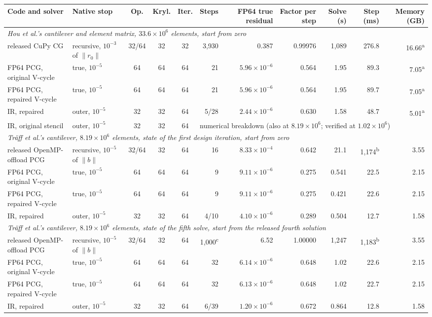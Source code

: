 \begin{tabular}{llcccrrrrrr}
\toprule
Code and solver & Native stop & Op. & Kryl. & Iter. & Steps & FP64 true residual & Factor per step & Solve (s) & Step (ms) & Memory (GB) \\
\midrule
\multicolumn{11}{l}{\emph{Hou et al.'s cantilever and element matrix, $33.6\times10^{6}$ elements, start from zero}} \\
released CuPy CG & recursive, $10^{-3}$ of $\|r_0\|$ & 32/64 & 32 & 32 & 3{,}930 & 0.387 & 0.99976 & 1{,}089 & 276.8 & 16.66\textsuperscript{a} \\
FP64 PCG, original V-cycle & true, $10^{-5}$ & 64 & 64 & 64 & 21 & $5.96\times10^{-6}$ & 0.564 & 1.95 & 89.3 & 7.05\textsuperscript{a} \\
FP64 PCG, repaired V-cycle & true, $10^{-5}$ & 64 & 64 & 64 & 21 & $5.96\times10^{-6}$ & 0.564 & 1.95 & 89.7 & 7.05\textsuperscript{a} \\
IR, repaired & outer, $10^{-5}$ & 32 & 32 & 64 & 5/28 & $2.44\times10^{-6}$ & 0.630 & 1.58 & 48.7 & 5.01\textsuperscript{a} \\
IR, original stencil & outer, $10^{-5}$ & 32 & 32 & 64 & \multicolumn{6}{l}{numerical breakdown (also at $8.19\times10^{6}$; verified at $1.02\times10^{6}$)} \\
\midrule
\multicolumn{11}{l}{\emph{Tr\"aff et al.'s cantilever, $8.19\times10^{6}$ elements, state of the first design iteration, start from zero}} \\
released OpenMP-offload PCG & recursive, $10^{-5}$ of $\|b\|$ & 32/64 & 32 & 64 & 16 & $8.33\times10^{-4}$ & 0.642 & 21.1 & 1{,}174\textsuperscript{b} & 3.55 \\
FP64 PCG, original V-cycle & true, $10^{-5}$ & 64 & 64 & 64 & 9 & $9.11\times10^{-6}$ & 0.275 & 0.541 & 22.5 & 2.15 \\
FP64 PCG, repaired V-cycle & true, $10^{-5}$ & 64 & 64 & 64 & 9 & $9.11\times10^{-6}$ & 0.275 & 0.421 & 22.6 & 2.15 \\
IR, repaired & outer, $10^{-5}$ & 32 & 32 & 64 & 4/10 & $4.10\times10^{-6}$ & 0.289 & 0.504 & 12.7 & 1.58 \\
\midrule
\multicolumn{11}{l}{\emph{Tr\"aff et al.'s cantilever, $8.19\times10^{6}$ elements, state of the fifth solve, start from the released fourth solution}} \\
released OpenMP-offload PCG & recursive, $10^{-5}$ of $\|b\|$ & 32/64 & 32 & 64 & 1{,}000\textsuperscript{c} & 6.52 & 1.00000 & 1{,}247 & 1{,}183\textsuperscript{b} & 3.55 \\
FP64 PCG, original V-cycle & true, $10^{-5}$ & 64 & 64 & 64 & 32 & $6.14\times10^{-6}$ & 0.648 & 1.02 & 22.6 & 2.15 \\
FP64 PCG, repaired V-cycle & true, $10^{-5}$ & 64 & 64 & 64 & 32 & $6.13\times10^{-6}$ & 0.648 & 1.02 & 22.7 & 2.15 \\
IR, repaired & outer, $10^{-5}$ & 32 & 32 & 64 & 6/39 & $1.20\times10^{-6}$ & 0.672 & 0.864 & 12.8 & 1.58 \\
\bottomrule
\end{tabular}
